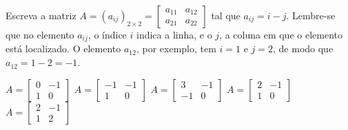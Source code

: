 Escreva a matriz $A=(a_{ij})_{2\times 2}=\left[ \begin{array}{cc}
a_{11} & a_{12} \\
a_{21} & a_{22}
\end{array} \right]$ tal que $a_{ij}=i-j$. Lembre-se que no elemento $a_{ij}$, o índice $i$ indica a linha, e o $j$, a coluna em que o elemento está localizado. O elemento $a_{12}$, por exemplo, tem $i=1$ e $j=2$, de modo que $a_{12}=1-2=-1$.

$A = \left[ \begin{array}{cc} 0 & -1 \\1 & 0 \end{array} \right]$
$A = \left[ \begin{array}{cc} -1 & -1 \\1 & 0 \end{array} \right]$
$A = \left[ \begin{array}{cc} 3 & -1 \\-1 & 0 \end{array} \right]$
$A = \left[ \begin{array}{cc} 2 & -1 \\1 & 0 \end{array} \right]$
$A = \left[ \begin{array}{cc} 2 & -1 \\1 & 2 \end{array} \right]$


